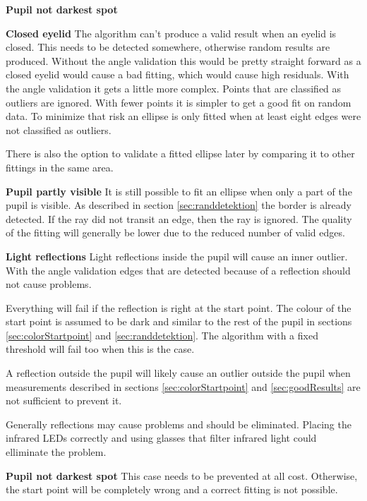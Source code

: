 \begin{labeling}{\textbf{Pupil not darkest spot}}
	\item [\textbf{Closed eyelid}] The algorithm can't produce a valid result when an eyelid is closed. This needs to be detected somewhere, otherwise random results are produced. Without the angle validation this would be pretty straight forward as a closed eyelid would cause a bad fitting, which would cause high residuals. With the angle validation it gets a little more complex. Points that are classified as outliers are ignored. With fewer points it is simpler to get a good fit on random data. To minimize that risk an ellipse is only fitted when at least eight edges were not classified as outliers.
	
	There is also the option to validate a fitted ellipse later by comparing it to other fittings in the same area.
	\item [\textbf{Pupil partly visible}] It is still possible to fit an ellipse when only a part of the pupil is visible. As described in section \ref{sec:randdetektion} the border is already detected. If the ray did not transit an edge, then the ray is ignored. The quality of the fitting will generally be lower due to the reduced number of valid edges.
	\item [\textbf{Light reflections}] Light reflections inside the pupil will cause an inner outlier. With the angle validation edges that are detected because of a reflection should not cause problems.
	
	Everything will fail if the reflection is right at the start point. The colour of the start point is assumed to be dark and similar to the rest of the pupil in sections \ref{sec:colorStartpoint} and \ref{sec:randdetektion}. The algorithm with a fixed threshold will fail too when this is the case.
	
	A reflection outside the pupil will likely cause an outlier outside the pupil when measurements described in sections \ref{sec:colorStartpoint} and \ref{sec:goodResults} are not sufficient to prevent it.
	
	Generally reflections may cause problems and should be eliminated. Placing the infrared \gls{LED}s correctly and using glasses that filter infrared light could elliminate the problem.
	\item [\textbf{Pupil not darkest spot}] This case needs to be prevented at all cost. Otherwise, the start point will be completely wrong and a correct fitting is not possible.
\end{labeling}

